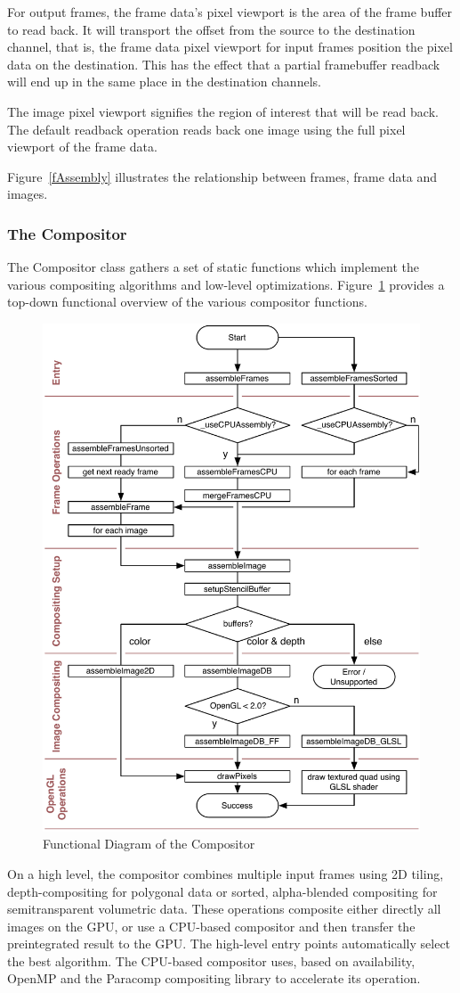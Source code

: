 \documentclass[10pt,a4]{scrartcl}
\newcommand{\fig}[1]{Figure~\ref{#1}}
\begin{document}
For output frames, the frame data's pixel viewport is the area of the
frame buffer to read back. It will transport the offset from the source
to the destination channel, that is, the frame data pixel viewport for
input frames position the pixel data on the destination. This has the
effect that a partial framebuffer readback will end up in the same place
in the destination channels.

The image pixel viewport signifies the region of interest that will be read
back. The default readback operation reads back one image using the full
pixel viewport of the frame data.

\fig{fAssembly} illustrates the relationship between frames, frame data
and images.

\subsubsection{\label{sCompositor}The Compositor}

The \textsf{Compositor} class gathers a set of static functions which
implement the various compositing algorithms and low-level
optimizations. \fig{fCompositor} provides a top-down functional overview
of the various compositor functions.

\begin{figure}[h!t]\center
  \includegraphics[width=.618\textwidth]{images/compositor.pdf}
  {\caption{\label{fCompositor}Functional Diagram of the Compositor}}
\end{figure}
On a high level, the compositor combines multiple input frames using 2D
tiling, depth-compositing for polygonal data or sorted, alpha-blended
compositing for semitransparent volumetric data. These operations
composite either directly all images on the GPU, or use a CPU-based
compositor and then transfer the preintegrated result to the GPU. The
high-level entry points automatically select the best algorithm. The
CPU-based compositor uses, based on availability, OpenMP and the
Paracomp compositing library to accelerate its operation.
\end{document}
